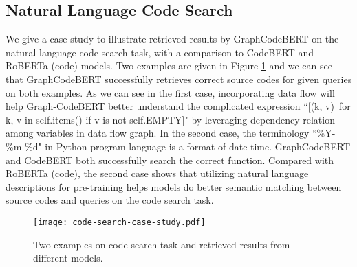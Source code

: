 \documentclass{article} \usepackage{iclr2021_conference,times}
\begin{document}
\subsection{Natural Language Code Search}
We give a case study to illustrate retrieved results by GraphCodeBERT on the natural language code search task, with a comparison to CodeBERT and RoBERTa (code) models. Two examples are given in Figure \ref{fig:code-search-case-study} and we can see that GraphCodeBERT successfully retrieves correct source codes for given queries on both examples. As we can see in the first case, incorporating data flow will help Graph-CodeBERT better understand the complicated expression ``[(k, v)\ for k, v in self.items() if v is not self.EMPTY]" by leveraging dependency relation among variables in data flow graph. In the second case, the terminology ``\%Y-\%m-\%d" in Python program language is a format of date time. GraphCodeBERT and CodeBERT both successfully search the correct function. Compared with RoBERTa (code), the second case shows that utilizing natural language descriptions for pre-training helps models do better semantic matching between source codes and queries on the code search task.
\begin{figure}[h]
\begin{center}
		\texttt{[image: code-search-case-study.pdf]}
		\caption{Two examples on code search task and retrieved results from different models.}
		\label{fig:code-search-case-study}
	\end{center}
\end{figure}

\iffalse 
\begin{figure}[h]
\begin{center}
		\texttt{[image: code-search-error-case.pdf]}
		\caption{Error cases of GraphCodeBERT on natural language code search.}
		\label{fig:code-search-error-case}
	\end{center}
\end{figure}
\fi 
\end{document}
